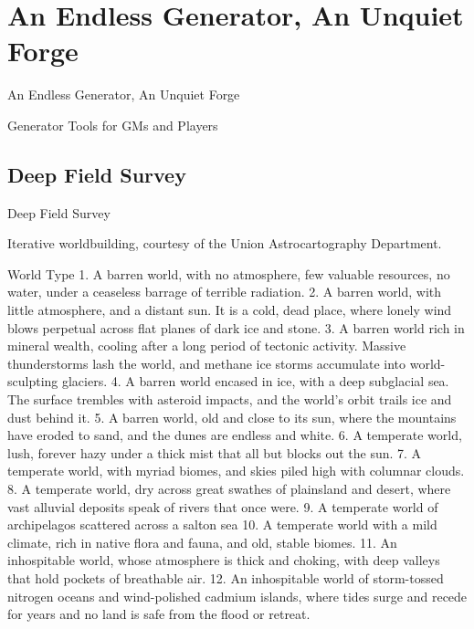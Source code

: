 \section{An Endless Generator, An Unquiet Forge}

An Endless Generator, An Unquiet Forge   

Generator Tools for GMs and Players   

\subsection{Deep Field Survey }

Deep Field Survey   

Iterative worldbuilding, courtesy of the Union Astrocartography Department.   

World Type   
     1.  A barren world, with no atmosphere, few valuable resources, no water, under a ceaseless  
         barrage of terrible radiation.   
     2.  A barren world, with little atmosphere, and a distant sun. It is a cold, dead place, where  
         lonely wind blows perpetual across flat planes of dark ice and stone.   
     3.  A barren world rich in mineral wealth, cooling after a long period of tectonic activity.  
         Massive thunderstorms lash the world, and methane ice storms accumulate into world- 
         sculpting glaciers.  
    4.   A barren world encased in ice, with a deep subglacial sea. The surface trembles with  
         asteroid impacts, and the world’s orbit trails ice and dust behind it.   
     5.  A barren world, old and close to its sun, where the mountains have eroded to sand, and  
         the dunes are endless and white.   
     6.  A temperate world, lush, forever hazy under a thick mist that all but blocks out the sun.    
     7.  A temperate world, with myriad biomes, and skies piled high with columnar clouds.   
     8.  A temperate world, dry across great swathes of plainsland and desert, where vast alluvial  
         deposits speak of rivers that once were.   
     9.  A temperate world of archipelagos scattered across a salton sea  
     10. A temperate world with a mild climate, rich in native flora and fauna, and old, stable  
         biomes.   
     11. An inhospitable world, whose atmosphere is thick and choking, with deep valleys that hold  
         pockets of breathable air.  
     12. An inhospitable world of storm-tossed nitrogen oceans and wind-polished cadmium  
         islands, where tides surge and recede for years and no land is safe from the flood or  
         retreat.    
